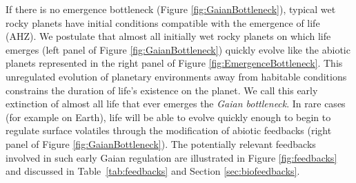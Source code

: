 If there is no emergence bottleneck (Figure \ref{fig:GaianBottleneck}), typical wet rocky planets have initial conditions compatible with the emergence of life (AHZ). We postulate that almost all initially wet rocky planets on which life emerges (left panel of Figure \ref{fig:GaianBottleneck}) quickly evolve like the abiotic planets  represented in the right panel of Figure \ref{fig:EmergenceBottleneck}. This unregulated evolution of planetary environments away from habitable conditions constrains the duration of life's existence on the planet. We call this early extinction of almost all life that ever emerges the \textit{Gaian bottleneck}. In rare cases (for example on Earth), life will be able to evolve quickly enough to begin to regulate surface volatiles through the modification of abiotic feedbacks (right panel of Figure \ref{fig:GaianBottleneck}). The potentially relevant feedbacks involved in such early Gaian regulation are illustrated in Figure \ref{fig:feedbacks} and discussed in Table~\ref{tab:feedbacks} and Section \ref{sec:biofeedbacks}.
